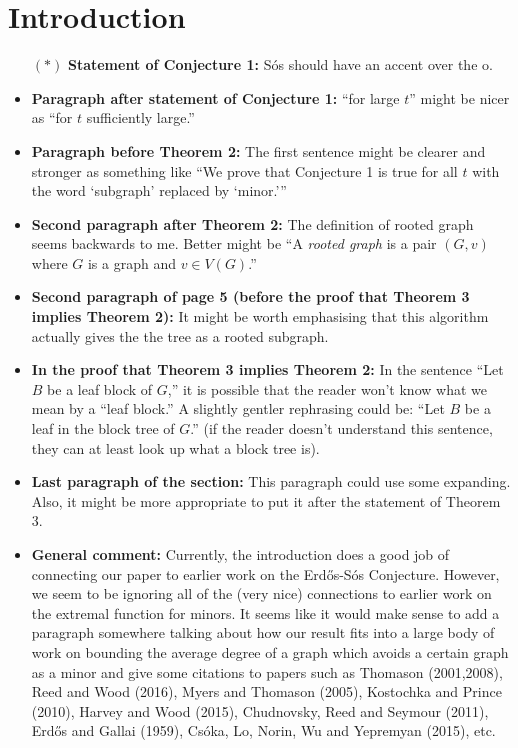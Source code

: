 \documentclass[11 pt]{article}
\theoremstyle{definition}
\theoremstyle{case}
\numberwithin{equation}{section}
\begin{document}
\section{Introduction}

\begin{itemize}
\item[$\boldsymbol{(*)}$] \textbf{Statement of Conjecture 1:} S\'os should have an accent over the o. 
\item \textbf{Paragraph after statement of Conjecture 1:} ``for large $t$'' might be nicer as ``for $t$ sufficiently large.''
\item \textbf{Paragraph before Theorem 2:} The first sentence might be clearer and stronger as something like ``{We prove that Conjecture 1 is true for all $t$ with the word `subgraph' replaced by `minor.'}''
\item \textbf{Second paragraph after Theorem 2:} The definition of rooted graph seems backwards to me. Better might be ``A \emph{rooted graph} is a pair $(G,v)$ where $G$ is a graph and $v\in V(G)$.''
\item\textbf{Second paragraph of page 5 (before the proof that Theorem 3 implies Theorem 2):} It might be worth emphasising that this algorithm actually gives the the tree as a rooted subgraph. 
\item \textbf{In the proof that Theorem 3 implies Theorem 2:}  In the sentence ``Let $B$ be a leaf block of $G$,'' it is possible that the reader won't know what we mean by a ``leaf block.'' A slightly gentler rephrasing could be: ``Let $B$ be a leaf in the block tree of $G$.'' (if the reader doesn't understand this sentence, they can at least look up what a block tree is). 
\item \textbf{Last paragraph of the section:} This paragraph could use some expanding. Also, it might be more appropriate to put it after the statement of Theorem 3. 
\item \textbf{General comment:} Currently, the introduction does a good job of connecting our paper to earlier work on the Erd\H{o}s-S\'os Conjecture. However, we seem to be ignoring all of the (very nice) connections to earlier work on the extremal function for minors. It seems like it would make sense to add a paragraph somewhere talking about how our result fits into a large body of work on bounding the average degree of a graph which avoids a certain graph as a minor and give some citations to papers such as Thomason (2001,2008), Reed and Wood (2016), Myers and Thomason (2005), Kostochka and Prince (2010), Harvey and Wood (2015), Chudnovsky, Reed and Seymour (2011), Erd\H{o}s and Gallai (1959), Cs\'oka, Lo, Norin, Wu and Yepremyan (2015), etc. 
\end{itemize}
\end{document}
